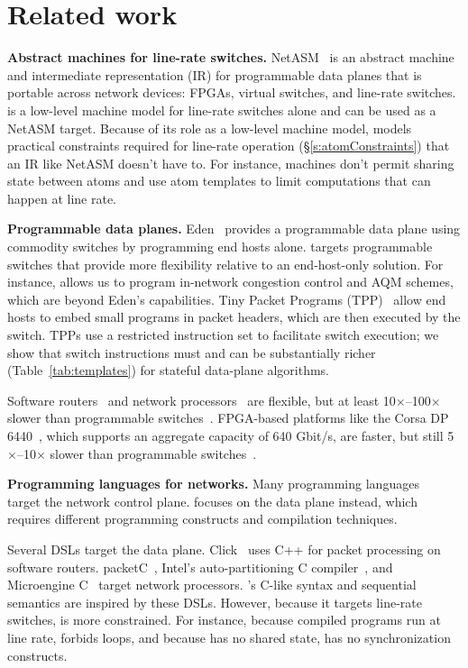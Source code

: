 \section{Related work}
\label{s:related}
\medskip
\noindent
\textbf{Abstract machines for line-rate switches.}
NetASM~\cite{netasm} is an abstract machine and intermediate representation
(IR) for programmable data planes that is portable across network
devices: FPGAs, virtual switches, and line-rate switches.  \absmachine is a
low-level machine model for line-rate switches alone and can be used as a
NetASM target. Because of its role as a low-level machine model, \absmachine
models practical constraints required for line-rate operation (\S\ref{s:atomConstraints}) that an IR like
NetASM doesn't have to. For instance, \absmachine machines don't permit sharing
state between atoms and use atom templates to limit computations that can
happen at line rate.

\medskip
\noindent
\textbf{Programmable data planes.}
Eden~\cite{eden} provides a programmable data plane using commodity switches by
programming end hosts alone. \pktlanguage targets programmable switches that
provide more flexibility relative to an end-host-only solution. For instance,
\pktlanguage allows us to program in-network congestion control and AQM
schemes, which are beyond Eden's capabilities.  Tiny Packet Programs
(TPP)~\cite{tpp} allow end hosts to embed small programs in packet headers,
which are then executed by the switch. TPPs use a restricted instruction set to
facilitate switch execution; we show that switch instructions must and can be
substantially richer (Table~\ref{tab:templates}) for stateful data-plane
algorithms.

Software routers~\cite{click, routebricks} and network processors~\cite{ixp4xx}
are flexible, but at least 10$\times$--100$\times$ slower than programmable
switches~\cite{xpliant, tofino}.  FPGA-based platforms like the Corsa DP
6440~\cite{corsa}, which supports an aggregate capacity of 640 Gbit/s, are
faster, but still 5$\times$--10$\times$ slower than programmable
switches~\cite{xpliant, tofino}.

\medskip
\noindent
\textbf{Programming languages for networks.} Many programming languages~\cite{frenetic, maple} target the network control plane.
\pktlanguage focuses on the data plane instead, which requires different
programming constructs and compilation techniques.

Several DSLs target the data plane. Click~\cite{click} uses C++ for packet
processing on software routers. packetC~\cite{packetc}, Intel's
auto-partitioning C compiler~\cite{intel_uiuc_pldi}, and Microengine
C~\cite{microenginec} target network processors. \pktlanguage's C-like syntax
and sequential semantics are inspired by these DSLs. However, because it targets
line-rate switches, \pktlanguage is more constrained. For instance, because
compiled programs run at line rate, \pktlanguage forbids loops, and because
\absmachine has no shared state, \pktlanguage has no synchronization constructs.

